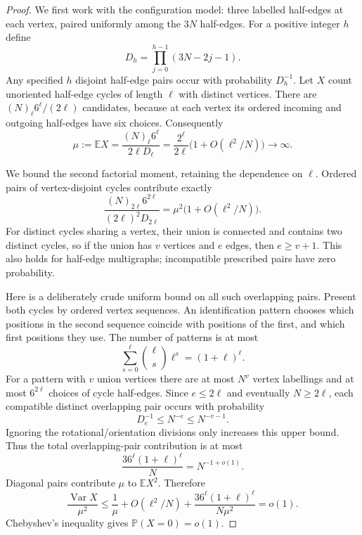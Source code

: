 \documentclass[11pt]{article}
\newcommand{\E}{\mathbb E}
\newcommand{\Prob}{\mathbb P}
\begin{document}
\begin{proof}
We first work with the configuration model: three labelled half-edges
at each vertex, paired uniformly among the $3N$ half-edges. For a
positive integer $h$ define
\[
 D_h=\prod_{j=0}^{h-1}(3N-2j-1).
\]
Any specified $h$ disjoint half-edge pairs occur with probability $D_h^{-1}$.
Let $X$ count unoriented half-edge cycles of length $\ell$ with distinct
vertices. There are $(N)_\ell6^\ell/(2\ell)$ candidates, because at each
vertex its ordered incoming and outgoing half-edges have six choices.
Consequently
\begin{equation}\label{eq:mean}
 \mu:=\E X=\frac{(N)_\ell6^\ell}{2\ell D_\ell}
       =\frac{2^\ell}{2\ell}
                       \bigl(1+O(\ell^2/N)\bigr)\longrightarrow\infty.
\end{equation}

We bound the second factorial moment, retaining the dependence on
$\ell$. Ordered pairs of vertex-disjoint cycles contribute exactly
\[
 \frac{(N)_{2\ell}6^{2\ell}}{(2\ell)^2D_{2\ell}}
                =\mu^2\bigl(1+O(\ell^2/N)\bigr).
\]
For distinct cycles sharing a vertex, their union is connected and
contains two distinct cycles, so if the union has $v$ vertices and $e$
edges, then $e\ge v+1$. This also holds for half-edge multigraphs;
incompatible prescribed pairs have zero probability.

Here is a deliberately crude uniform bound on all such overlapping
pairs. Present both cycles by ordered vertex sequences. An identification
pattern chooses which positions in the second sequence coincide with
positions of the first, and which first positions they use. The number
of patterns is at most
\[
              \sum_{s=0}^{\ell}\binom\ell s\ell^s=(1+\ell)^\ell.
\]
For a pattern with $v$ union vertices there are at most $N^v$ vertex
labellings and at most $6^{2\ell}$ choices of cycle half-edges. Since
$e\le2\ell$ and eventually $N\ge2\ell$, each compatible distinct
overlapping pair occurs with probability
\[
                   D_e^{-1}\le N^{-e}\le N^{-v-1}.
\]
Ignoring the rotational/orientation divisions only increases this upper
bound. Thus the total overlapping-pair contribution is at most
\begin{equation}\label{eq:overlap}
           \frac{36^\ell(1+\ell)^\ell}{N}=N^{-1+o(1)}.
\end{equation}
Diagonal pairs contribute $\mu$ to $\E X^2$. Therefore
\[
 \frac{\operatorname{Var}X}{\mu^2}
 \le\frac1\mu+O(\ell^2/N)
       +\frac{36^\ell(1+\ell)^\ell}{N\mu^2}=o(1).
\]
Chebyshev's inequality gives $\Prob(X=0)=o(1)$.


\end{proof}
\end{document}
